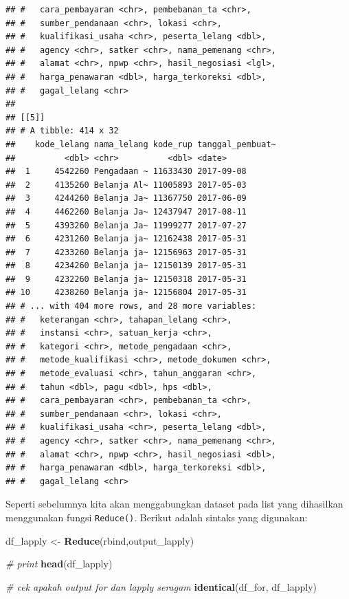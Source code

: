 \documentclass[]{book}
\newenvironment{Shaded}{\begin{snugshade}}{\end{snugshade}}
\newcommand{\KeywordTok}[1]{\textcolor[rgb]{0.13,0.29,0.53}{\textbf{#1}}}
\newcommand{\StringTok}[1]{\textcolor[rgb]{0.31,0.60,0.02}{#1}}
\newcommand{\CommentTok}[1]{\textcolor[rgb]{0.56,0.35,0.01}{\textit{#1}}}
\newcommand{\NormalTok}[1]{#1}
\begin{document}
\begin{verbatim}
## #   cara_pembayaran <chr>, pembebanan_ta <chr>,
## #   sumber_pendanaan <chr>, lokasi <chr>,
## #   kualifikasi_usaha <chr>, peserta_lelang <dbl>,
## #   agency <chr>, satker <chr>, nama_pemenang <chr>,
## #   alamat <chr>, npwp <chr>, hasil_negosiasi <lgl>,
## #   harga_penawaran <dbl>, harga_terkoreksi <dbl>,
## #   gagal_lelang <chr>
## 
## [[5]]
## # A tibble: 414 x 32
##    kode_lelang nama_lelang kode_rup tanggal_pembuat~
##          <dbl> <chr>          <dbl> <date>          
##  1     4542260 Pengadaan ~ 11633430 2017-09-08      
##  2     4135260 Belanja Al~ 11005893 2017-05-03      
##  3     4244260 Belanja Ja~ 11367750 2017-06-09      
##  4     4462260 Belanja Ja~ 12437947 2017-08-11      
##  5     4393260 Belanja Ja~ 11999277 2017-07-27      
##  6     4231260 Belanja ja~ 12162438 2017-05-31      
##  7     4233260 Belanja ja~ 12156963 2017-05-31      
##  8     4234260 Belanja ja~ 12150139 2017-05-31      
##  9     4232260 Belanja ja~ 12150318 2017-05-31      
## 10     4238260 Belanja ja~ 12156804 2017-05-31      
## # ... with 404 more rows, and 28 more variables:
## #   keterangan <chr>, tahapan_lelang <chr>,
## #   instansi <chr>, satuan_kerja <chr>,
## #   kategori <chr>, metode_pengadaan <chr>,
## #   metode_kualifikasi <chr>, metode_dokumen <chr>,
## #   metode_evaluasi <chr>, tahun_anggaran <chr>,
## #   tahun <dbl>, pagu <dbl>, hps <dbl>,
## #   cara_pembayaran <chr>, pembebanan_ta <chr>,
## #   sumber_pendanaan <chr>, lokasi <chr>,
## #   kualifikasi_usaha <chr>, peserta_lelang <dbl>,
## #   agency <chr>, satker <chr>, nama_pemenang <chr>,
## #   alamat <chr>, npwp <chr>, hasil_negosiasi <dbl>,
## #   harga_penawaran <dbl>, harga_terkoreksi <dbl>,
## #   gagal_lelang <chr>
\end{verbatim}

Seperti sebelumnya kita akan menggabungkan dataset pada list yang
dihasilkan menggunakan fungsi \texttt{Reduce()}. Berikut adalah sintaks
yang digunakan:

\begin{Shaded}
\begin{Highlighting}[]
\NormalTok{df_lapply <-}\StringTok{ }\KeywordTok{Reduce}\NormalTok{(rbind,output_lapply)}

\CommentTok{# print}
\KeywordTok{head}\NormalTok{(df_lapply)}

\CommentTok{# cek apakah output for dan lapply seragam}
\KeywordTok{identical}\NormalTok{(df_for, df_lapply)}
\end{Highlighting}
\end{Shaded}
\end{document}
